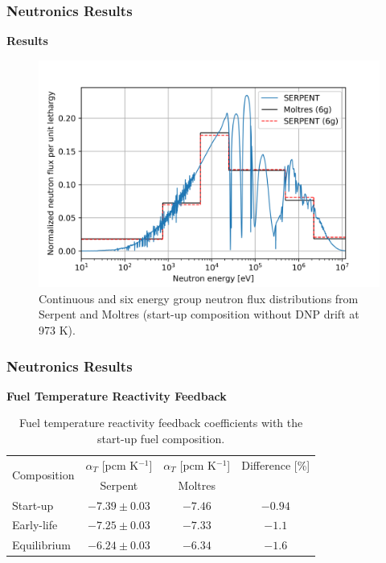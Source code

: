 \begin{frame}
	\frametitle{Neutronics Results}
		\textbf{Results}
			\begin{figure}
				\centering
				\includegraphics[width=.8\textwidth]{../paper/figures/nt-spec}
				\caption{Continuous and six energy group neutron flux
				distributions from Serpent and Moltres (start-up composition
				without \gls{DNP} drift at 973 K).}
				\label{fig:ntspec}
			\end{figure}
\end{frame}

\begin{frame}
	\frametitle{Neutronics Results}
		\textbf{Fuel Temperature Reactivity Feedback}
			\begin{table}[t]
				\centering
				\caption{Fuel temperature reactivity feedback coefficients with
				the start-up fuel composition.}
				\begin{tabular}{lccc}
					\hline
					\multirow{2}{*}{Composition} & {$\alpha_T$ [pcm K$^{-1}$]} & {$\alpha_T$ [pcm K$^{-1}$]} & Difference [\%]\\
					& Serpent & Moltres & \\
					\hline
					Start-up & $-7.39 \pm 0.03$ & $-7.46$ & $-0.94$\\
					Early-life & $-7.25 \pm 0.03$ & $-7.33$ & $-1.1$\\
					Equilibrium & $-6.24 \pm 0.03$ & $-6.34$ & $-1.6$\\
					\hline
				\end{tabular}
				\label{table:reactivity}
			\end{table}	
\end{frame}
